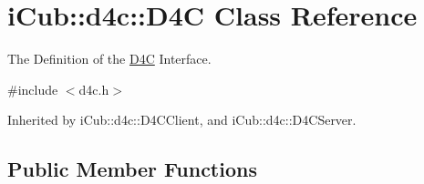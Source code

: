 \section{i\+Cub\+:\+:d4c\+:\+:D4\+C Class Reference}
\label{classiCub_1_1d4c_1_1D4C}


The Definition of the \hyperlink{classiCub_1_1d4c_1_1D4C}{D4\+C} Interface.  




{\ttfamily \#include $<$d4c.\+h$>$}



Inherited by i\+Cub\+::d4c\+::\+D4\+C\+Client, and i\+Cub\+::d4c\+::\+D4\+C\+Server.

\subsection*{Public Member Functions}
